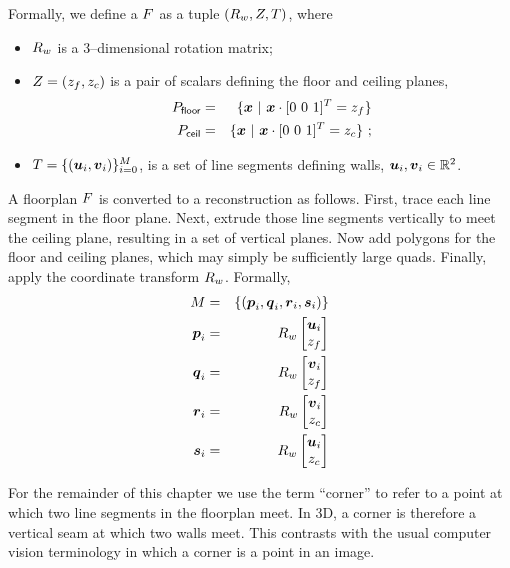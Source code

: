 Formally, we define a $\Floorplan$ as a tuple
$(\SceneR,\Zs,\Polyline)$, where
\begin{itemize}
  \item{$\SceneR$ is a 3--dimensional rotation matrix;}
  \item{$\Zs=(\zfloor,\zceil)$ is a pair of scalars defining the floor
    and ceiling planes,
    \begin{eqnarray}
      \Pfloor &=& \{ \vect{x} ~|~ \vect{x} \cdot [0~0~1]^T = \zfloor \}\\
      \Pceil  &=& \{ \vect{x} ~|~ \vect{x} \cdot [0~0~1]^T = \zceil \} ~;
    \end{eqnarray}
  }
  \item{$\Polyline=\{(\startpt_i,\enpt_i)\}_{i=0}^M$, is a set of line
    segments defining walls, $\startpt_i,\enpt_i \in \Rtwo$.}
\end{itemize}

A floorplan $\Floorplan$ is converted to a reconstruction as
follows. First, trace each line segment in the floor plane. Next,
extrude those line segments vertically to meet the ceiling plane,
resulting in a set of vertical planes. Now add polygons for the floor
and ceiling planes, which may simply be sufficiently large
quads. Finally, apply the coordinate transform $\SceneR$. Formally,
\begin{eqnarray}
  \Reconstruction &=& 
  \{ ( \vect{p}_i, \vect{q}_i, \vect{r}_i, \vect{s}_i ) \} \\
  \vect{p}_i &=& \SceneR \begin{bmatrix} \startpt_i \\ \zfloor \end{bmatrix} \\
  \vect{q}_i &=& \SceneR \begin{bmatrix} \enpt_i \\ \zfloor \end{bmatrix} \\
  \vect{r}_i &=& \SceneR \begin{bmatrix} \enpt_i \\ \zceil \end{bmatrix} \\
  \vect{s}_i &=& \SceneR \begin{bmatrix} \startpt_i \\ \zceil \end{bmatrix}
\end{eqnarray}

For the remainder of this chapter we use the term ``corner'' to refer
to a point at which two line segments in the floorplan meet. In 3D, a
corner is therefore a vertical seam at which two walls meet. This
contrasts with the usual computer vision terminology in which a corner
is a point in an image.

